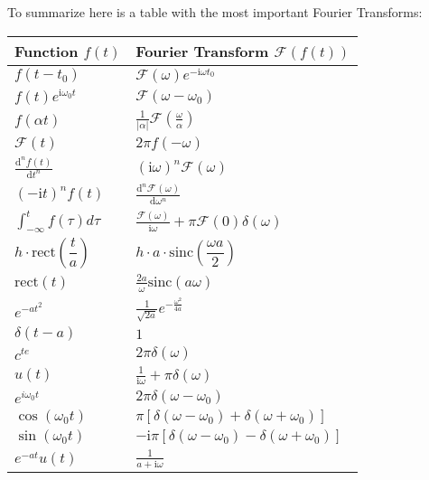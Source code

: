 	To summarize here is a table with the most important Fourier Transforms:
	\begin{table}[H]
		\centering
		\begin{tabular}{|l|l|}
		\hline
		\rowcolor[HTML]{C0C0C0} 
		\textbf{Function} $f(t)$ & \textbf{Fourier Transform} $\mathcal{F}(f(t))$ \\ \hline
		 $f(t-t_0)$ & $\mathcal{F}(\omega) e^{-\mathrm{i} \omega t_0}$ \\ \hline
		 $f(t) e^{\mathrm{i} \omega_0 t}$ & $\mathcal{F}\left(\omega-\omega_0\right)$ \\ \hline
		 $f(\alpha t)$ & $\displaystyle\frac{1}{|\alpha|} \mathcal{F}\left(\frac{\omega}{\alpha}\right)$ \\ \hline
		 $\mathcal{F}(t)$ & $2 \pi f(-\omega)$ \\ \hline
		 $\displaystyle\frac{\mathrm{d}^n f(t)}{\mathrm{d} t^n}$ & $(\mathrm{i} \omega)^n \mathcal{F}(\omega)$ \\ \hline
		 $(-\mathrm{i} t)^n f(t)$ & $\displaystyle\frac{\mathrm{d}^n \mathcal{F}(\omega)}{\mathrm{d} \omega^n}$ \\ \hline
		  $\displaystyle\int_{-\infty}^t f(\tau) d \tau$ & $\displaystyle\frac{\mathcal{F}(\omega)}{\mathrm{i} \omega}+\pi \mathcal{F}(0) \delta(\omega)$ \\ \hline
		 $h\cdot\text{rect}\left(\dfrac{t}{a}\right)$& $h\cdot a\cdot\text{sinc}\left(\dfrac{\omega a}{2}\right)$ \\ \hline
		  $\text{rect}(t)$& $\frac{2 a}{\omega} \text{sinc}(a \omega)$ \\ \hline
		 $e^{-a t^2}$ & $\displaystyle\frac{1}{\sqrt{2 a}} e^{-\frac{\omega^2}{4 a}}$ \\ \hline
		 $\delta(t-a)$ & $1$ \\ \hline
		 $c^{te}$  & $2 \pi \delta(\omega)$ \\ \hline
		 $u(t)$ & $\displaystyle\frac{1}{\mathrm{i} \omega}+\pi \delta(\omega)$ \\ \hline
		 $e^{i \omega_0 t}$ & $2 \pi \delta\left(\omega-\omega_0\right)$ \\ \hline
		 $\cos \left(\omega_0 t\right)$ & $\pi\left[\delta\left(\omega-\omega_0\right)+\delta\left(\omega+\omega_0\right)\right]$ \\ \hline
		 $\sin \left(\omega_0 t\right)$ & $-\mathrm{i}\pi\left[\delta\left(\omega-\omega_0\right)-\delta\left(\omega+\omega_0\right)\right]$  \\ \hline
		$e^{-a t} u(t)$ & $\displaystyle\frac{1}{a+\mathrm{i} \omega}$ \\ \hline

\end{tabular}
\end{table}
